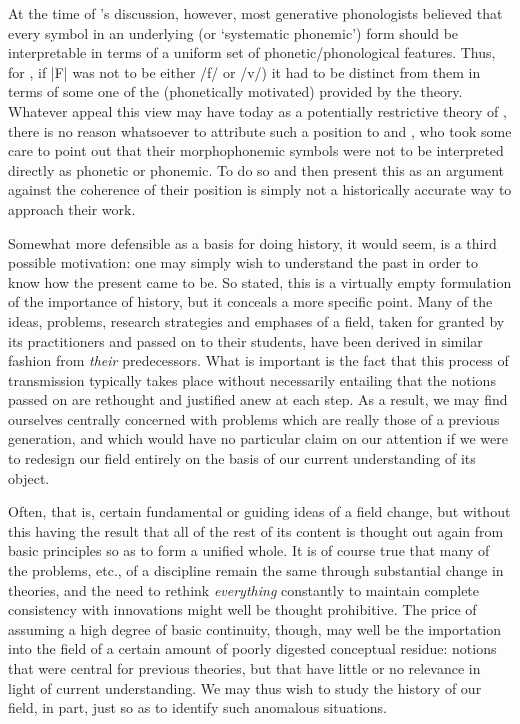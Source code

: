At the time of {\Lightner}'s discussion, however, most generative
phonologists believed that every symbol in an underlying (or
`systematic phonemic') form should be interpretable in terms of a
uniform set of phonetic/phonological features.  Thus, for {\Lightner}, if
|F| was not to be either /f/ or /v/) it had to be
distinct from them in terms of some one of the (phonetically
motivated)  provided by the theory. Whatever
appeal this view may have today as a potentially restrictive theory of
, there is no reason whatsoever to attribute such a
position to {\Swadesh} and {\Voegelin}, who took some care to point out that
their morphophonemic symbols were not to be interpreted directly as
phonetic or phonemic.  To do so and then present this as an argument
against the coherence of their position is simply not a historically
accurate way to approach their work.

Somewhat more defensible as a basis for doing history, it would seem,
is a third possible motivation: one may simply wish to understand the
past in order to know how the present came to be.  So stated, this is
a virtually empty formulation of the importance of history, but it
conceals a more specific point.  Many of the ideas, problems, research
strategies and emphases of a field, taken for granted by its
practitioners and passed on to their students, have been derived in
similar fashion from \emph{their} predecessors.  What is important
is the fact that this process of transmission typically takes place without
necessarily entailing that the notions passed on are rethought and
justified anew at each step.  As a result, we may find ourselves
centrally concerned with problems which are really those of a previous
generation, and which would have no particular claim on our attention
if we were to redesign our field entirely on the basis of our current
understanding of its object.

Often, that is, certain fundamental or guiding ideas of a field
{change}, but without this having the result that all of the rest of its
content is thought out again from basic principles so as to form a
unified whole. It is of course true that many of the problems, etc.,
of a discipline remain the same through substantial {change} in
theories, and the need to rethink \emph{everything} constantly to
maintain complete consistency with innovations might well be thought
prohibitive.  The price of assuming a high degree of basic continuity,
though, may well be the importation into the field of a certain amount
of poorly digested conceptual residue: notions that were central for
previous theories, but that have little or no relevance in light of
current understanding. We may thus wish to study the history of our
field, in part, just so as to identify such anomalous situations.

